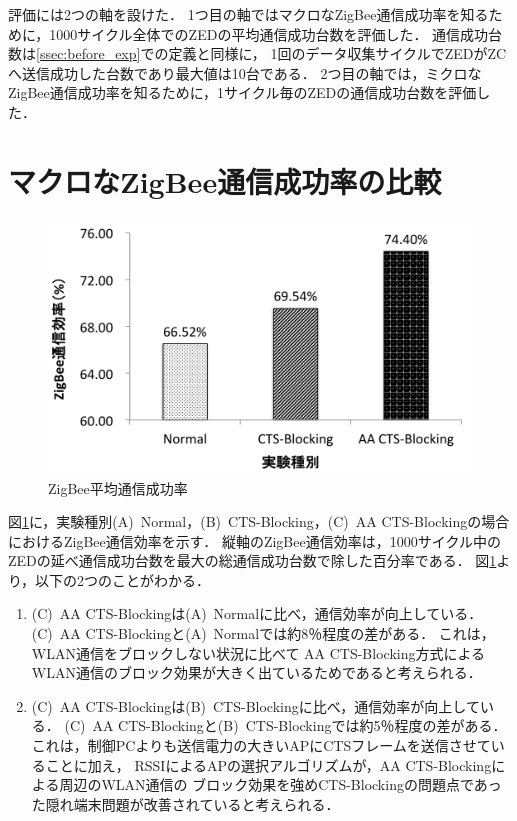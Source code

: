 \documentclass[12pt]{jreport}
\begin{document}
評価には2つの軸を設けた．
1つ目の軸ではマクロなZigBee通信成功率を知るために，1000サイクル全体でのZEDの平均通信成功台数を評価した．
通信成功台数は\ref{ssec:before_exp}での定義と同様に，
1回のデータ収集サイクルでZEDがZCへ送信成功した台数であり最大値は10台である．
2つ目の軸では，ミクロなZigBee通信成功率を知るために，1サイクル毎のZEDの通信成功台数を評価した．

\section{マクロなZigBee通信成功率の比較}
\label{sec:exp_result_all}

\begin{figure}[bt]
 \centering
 \includegraphics[width=\columnwidth]{figure/eff_all_zigbee.pdf}
 \caption{ZigBee平均通信成功率}
 \label{fig:eff_all_zigbee}
\end{figure}

図\ref{fig:eff_all_zigbee}に，実験種別(A)~Normal，(B)~CTS-Blocking，(C)~AA CTS-Blockingの場合におけるZigBee通信効率を示す．
縦軸のZigBee通信効率は，1000サイクル中のZEDの延べ通信成功台数を最大の総通信成功台数で除した百分率である．
図\ref{fig:eff_all_zigbee}より，以下の2つのことがわかる．
\begin{enumerate}
 \item (C)~AA CTS-Blockingは(A)~Normalに比べ，通信効率が向上している．
(C)~AA CTS-Blockingと(A)~Normalでは約8％程度の差がある．
これは，WLAN通信をブロックしない状況に比べて
AA CTS-Blocking方式によるWLAN通信のブロック効果が大きく出ているためであると考えられる．

 \item (C)~AA CTS-Blockingは(B)~CTS-Blockingに比べ，通信効率が向上している．
(C)~AA CTS-Blockingと(B)~CTS-Blockingでは約5％程度の差がある．
これは，制御PCよりも送信電力の大きいAPにCTSフレームを送信させていることに加え，
RSSIによるAPの選択アルゴリズムが，AA CTS-Blockingによる周辺のWLAN通信の
ブロック効果を強めCTS-Blockingの問題点であった隠れ端末問題が改善されていると考えられる．

\end{enumerate}
\end{document}
